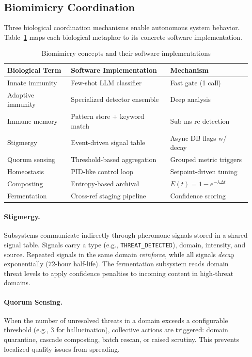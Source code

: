\documentclass[11pt]{article}
\begin{document}
\subsection{Biomimicry Coordination}
\label{sec:biomimicry}

Three biological coordination mechanisms enable autonomous system behavior. Table~\ref{tab:biomimicry} maps each biological metaphor to its concrete software implementation.

\begin{table}[h]
\centering
\caption{Biomimicry concepts and their software implementations}
\label{tab:biomimicry}
\begin{tabular}{lll}
\toprule
\textbf{Biological Term} & \textbf{Software Implementation} & \textbf{Mechanism} \\
\midrule
Innate immunity & Few-shot LLM classifier & Fast gate (1 call) \\
Adaptive immunity & Specialized detector ensemble & Deep analysis \\
Immune memory & Pattern store + keyword match & Sub-ms re-detection \\
Stigmergy & Event-driven signal table & Async DB flags w/ decay \\
Quorum sensing & Threshold-based aggregation & Grouped metric triggers \\
Homeostasis & PID-like control loop & Setpoint-driven tuning \\
Composting & Entropy-based archival & $E(t) = 1-e^{-\lambda\Delta t}$ \\
Fermentation & Cross-ref staging pipeline & Confidence scoring \\
\bottomrule
\end{tabular}
\end{table}

\paragraph{Stigmergy.} Subsystems communicate indirectly through pheromone signals stored in a shared signal table. Signals carry a type (e.g., \texttt{THREAT\_DETECTED}), domain, intensity, and source. Repeated signals in the same domain \emph{reinforce}, while all signals \emph{decay} exponentially (72-hour half-life). The fermentation subsystem reads domain threat levels to apply confidence penalties to incoming content in high-threat domains.

\paragraph{Quorum Sensing.} When the number of unresolved threats in a domain exceeds a configurable threshold (e.g., 3 for hallucination), collective actions are triggered: domain quarantine, cascade composting, batch rescan, or raised scrutiny. This prevents localized quality issues from spreading.
\end{document}
